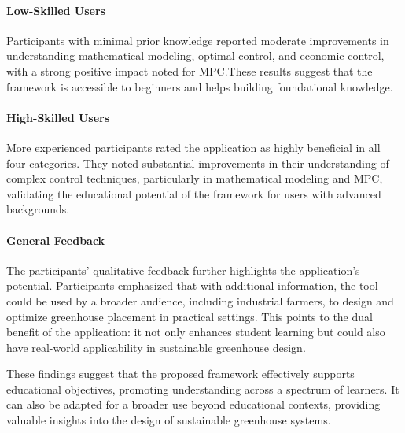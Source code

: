 \documentclass[conference]{IEEEtran}
\begin{document}
\paragraph{Low-Skilled Users}
Participants with minimal prior knowledge reported moderate improvements in understanding mathematical modeling, optimal control, and economic control, with a strong positive impact noted for MPC.\@ These results suggest that the framework is accessible to beginners and helps building foundational knowledge.

\paragraph{High-Skilled Users}
More experienced participants rated the application as highly beneficial in all four categories. They noted substantial improvements in their understanding of complex control techniques, particularly in mathematical modeling and MPC, validating the educational potential of the framework for users with advanced backgrounds.

\paragraph{General Feedback}
The participants' qualitative feedback further highlights the application's potential. Participants emphasized that with additional information, the tool could be used by a broader audience, including industrial farmers, to design and optimize greenhouse placement in practical settings. This points to the dual benefit of the application: it not only enhances student learning but could also have real-world applicability in sustainable greenhouse design.

These findings suggest that the proposed framework effectively supports educational objectives, promoting understanding across a spectrum of learners. It can also be adapted for a broader use beyond educational contexts, providing valuable insights into the design of sustainable greenhouse systems.
\end{document}
